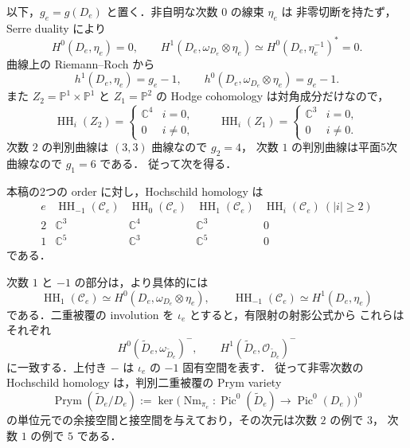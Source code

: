 以下，$g_e=g(D_e)$ と置く．非自明な次数 $0$ の線束 $\eta_e$ は
非零切断を持たず，Serre duality により
\[
 H^0(D_e,\eta_e)=0,
 \qquad
 H^1(D_e,\omega_{D_e}\otimes\eta_e)
 \simeq H^0(D_e,\eta_e^{-1})^*=0.
\]
曲線上の Riemann--Roch から
\begin{equation}
 h^1(D_e,\eta_e)=g_e-1,
 \qquad
 h^0(D_e,\omega_{D_e}\otimes\eta_e)=g_e-1.
 \label{eq:hh-eta-dimensions}
\end{equation}
また $Z_2=\mathbb P^1\times\mathbb P^1$ と $Z_1=\mathbb P^2$ の
Hodge cohomology は対角成分だけなので，
\[
 \operatorname{HH}_i(Z_2)=
 \begin{cases}\mathbb C^4&i=0,\\0&i\ne0,\end{cases}
 \qquad
 \operatorname{HH}_i(Z_1)=
 \begin{cases}\mathbb C^3&i=0,\\0&i\ne0.\end{cases}
\]
次数 $2$ の判別曲線は $(3,3)$ 曲線なので $g_2=4$，
次数 $1$ の判別曲線は平面5次曲線なので $g_1=6$ である．
従って次を得る．

\begin{proposition}
\label{prop:hh-values}
本稿の2つの order に対し，Hochschild homology は
\[
\begin{array}{c|cccc}
 e & \operatorname{HH}_{-1}(\mathcal C_e)
   & \operatorname{HH}_{0}(\mathcal C_e)
   & \operatorname{HH}_{1}(\mathcal C_e)
   & \operatorname{HH}_{i}(\mathcal C_e)\ (|i|\ge2)\\\hline
 2 & \mathbb C^3 & \mathbb C^4 & \mathbb C^3 & 0\\
 1 & \mathbb C^5 & \mathbb C^3 & \mathbb C^5 & 0
\end{array}
\]
である．
\end{proposition}

次数 $1$ と $-1$ の部分は，より具体的には
\begin{equation}
 \operatorname{HH}_1(\mathcal C_e)
 \simeq H^0(D_e,\omega_{D_e}\otimes\eta_e),
 \qquad
 \operatorname{HH}_{-1}(\mathcal C_e)
 \simeq H^1(D_e,\eta_e)
 \label{eq:hh-prym-pieces}
\end{equation}
である．二重被覆の involution を $\iota_e$ とすると，有限射の射影公式から
これらはそれぞれ
\[
 H^0(\widetilde D_e,\omega_{\widetilde D_e})^{-},
 \qquad
 H^1(\widetilde D_e,\mathcal O_{\widetilde D_e})^{-}
\]
に一致する．上付き $-$ は $\iota_e$ の $-1$ 固有空間を表す．
従って非零次数の Hochschild homology は，判別二重被覆の Prym variety
\[
 \operatorname{Prym}(\widetilde D_e/D_e)
 :=\ker\bigl(\operatorname{Nm}_{\pi_e}:
 \operatorname{Pic}^0(\widetilde D_e)\to\operatorname{Pic}^0(D_e)\bigr)^0
\]
の単位元での余接空間と接空間を与えており，その次元は次数 $2$ の例で $3$，
次数 $1$ の例で $5$ である．


